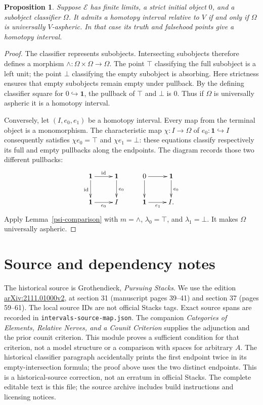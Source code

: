 \documentclass[11pt]{amsart}
\newtheorem{proposition}{Proposition}[section]
\theoremstyle{remark}
\newcommand{\id}{\operatorname{id}}
\newcommand{\one}{\mathbf 1}
\newcommand{\PSM}[1]{\par\smallskip{\small\raggedright\noindent Source-map identifiers: \texttt{#1}.\par}\smallskip}
\begin{document}
\begin{proposition}\label{psi-classifier}
Suppose $\mathcal E$ has finite limits, a strict initial object $0$,
and a subobject classifier $\Omega$. It admits a homotopy interval
relative to $V$ if and only if $\Omega$ is universally $V$-aspheric.
In that case its truth and falsehood points give a homotopy interval.
\end{proposition}
\PSM{PSM-PROP-0028}
\begin{proof}
The classifier represents subobjects. Intersecting subobjects therefore
defines a morphism $\wedge:\Omega\times\Omega\to\Omega$.
The point $\top$ classifying the full subobject is a left unit;
the point $\bot$ classifying the empty subobject is absorbing.
Here strictness ensures that empty subobjects remain empty under pullback.
By the defining classifier square for $0\hookrightarrow\one$,
the pullback of $\top$ and $\bot$ is $0$. Thus if $\Omega$ is
universally aspheric it is a homotopy interval.

Conversely, let $(I,e_0,e_1)$ be a homotopy interval. Every map
from the terminal object is a monomorphism. The characteristic map
$\chi:I\to\Omega$ of $e_0:\one\hookrightarrow I$ consequently
satisfies $\chi e_0=\top$ and $\chi e_1=\bot$: these equations
classify respectively its full and empty pullbacks along the endpoints.
The diagram records those two different pullbacks:
\[
\xymatrix@C=25pt{
 \one\ar[r]^{\id}\ar[d]_{\id}&\one\ar[d]^{e_0}\\
 \one\ar[r]_{e_0}&I
}
\qquad
\xymatrix@C=25pt{
 0\ar[r]\ar[d]&\one\ar[d]^{e_0}\\
 \one\ar[r]_{e_1}&I.
}
\]
Apply Lemma~\ref{psi-comparison} with $m=\wedge$, $\lambda_0=\top$,
and $\lambda_1=\bot$. It makes $\Omega$ universally aspheric.
\end{proof}

\section*{Source and dependency notes}
The historical source is Grothendieck, \emph{Pursuing Stacks}.
We use the edition \href{https://arxiv.org/abs/2111.01000}{arXiv:2111.01000v2},
at section 31 (manuscript pages 39--41) and section 37 (pages 59--61).
The local source IDs are not official Stacks tags. Exact source spans
are recorded in \nolinkurl{intervals-source-map.json}.
The companion \emph{Categories of Elements, Relative Nerves, and a Counit
Criterion} supplies the adjunction and the prior counit criterion.
This module proves a sufficient condition for that criterion, not a
model structure or a comparison with spaces for arbitrary $A$.
The historical classifier paragraph accidentally prints the first endpoint
twice in its empty-intersection formula; the proof above uses the two
distinct endpoints. This is a historical-source correction, not an
erratum in official Stacks. The complete editable text is this file;
the source archive includes build instructions and licensing notices.
\end{document}
